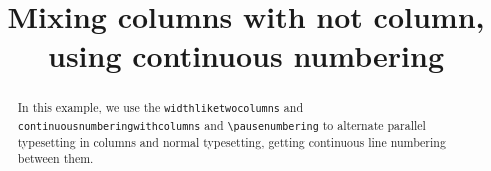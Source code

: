 \documentclass[]{article}
\begin{document}
\begin{english}
\title{Mixing columns with not column, using continuous numbering}
\begin{abstract}
In this example, we use the \verb+widthliketwocolumns+ and \verb+continuousnumberingwithcolumns+ and \verb+\pausenumbering+ to alternate parallel typesetting in columns and normal typesetting, getting continuous line numbering between them.
\end{abstract}
\end{english}
\begin{pairs}  
\begin{Leftside} 
\beginnumbering  
\pstart  

\lipsum[23]
\pend  
\pausenumbering
\end{Leftside} 

\begin{Rightside}   
\beginnumbering  
\pstart  
\lipsum[25]
\pend  
\pausenumbering
\end{Rightside}  

\end{pairs}  
\Columns

\resumenumbering
\pstart  
\lipsum[23]
\pend  
\pausenumbering

\begin{pairs}  
 

\begin{Leftside} 
\resumenumbering  
\pstart  

\lipsum[23]
\pend  
\pausenumbering 
\end{Leftside}

\begin{Rightside}   
\resumenumbering  
\pstart  
\lipsum[25]
\pend  
\pausenumbering
\end{Rightside}  
\end{pairs}  
\Columns

\resumenumbering  
\pstart  
\lipsum[25]
\pend  
\pausenumbering

\begin{pairs}  
  

\begin{Leftside} 
\resumenumbering  
\pstart  

\lipsum[25]
\pend  
\pausenumbering 
\end{Leftside}

\begin{Rightside}   
\resumenumbering  
\pstart  
\lipsum[23]
\pend  
\endnumbering
\end{Rightside} 
\end{pairs}  

\Columns
\resumenumbering  
\pstart  
\lipsum[25]
\pend  
\pausenumbering
\end{document}
